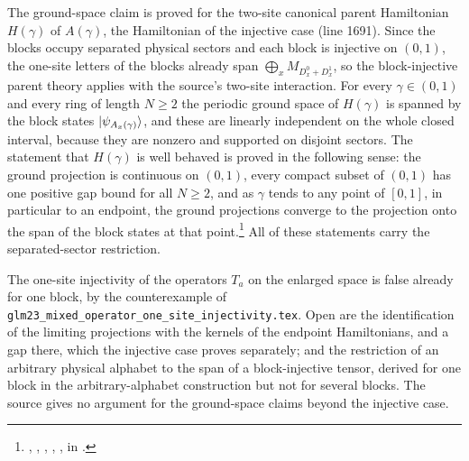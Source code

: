 \documentclass{article}
\begin{document}
The ground-space claim is proved for the two-site canonical parent
Hamiltonian $H(\gamma)$ of $A(\gamma)$, the Hamiltonian of the injective
case (line 1691). Since the blocks occupy separated physical sectors and
each block is injective on $(0,1)$, the one-site letters of the blocks
already span $\bigoplus_x M_{D^0_x+D^1_x}$, so the block-injective parent
theory applies with the source's two-site interaction. For every
$\gamma\in(0,1)$ and every ring of length $N\ge2$ the periodic ground space
of $H(\gamma)$ is spanned by the block states
$|\psi_{A_x(\gamma)}\rangle$, and these are linearly independent on the
whole closed interval, because they are nonzero and supported on disjoint
sectors. The statement that $H(\gamma)$ is well behaved is proved in the
following sense: the ground projection is continuous on $(0,1)$, every
compact subset of $(0,1)$ has one positive gap bound for all $N\ge2$, and
as $\gamma$ tends to any point of $[0,1]$, in particular to an endpoint,
the ground projections converge to the projection onto the span of the
block states at that point.\footnote{%
    ,
    ,
    ,
    ,
    ,
    in .}
All of these statements carry the separated-sector restriction.

The one-site injectivity of the operators $T_a$ on the enlarged space is
false already for one block, by the counterexample of
\texttt{glm23\_mixed\_operator\_one\_site\_injectivity.tex}. Open are the
identification of the limiting projections with the kernels of the
endpoint Hamiltonians, and a gap there, which the injective case proves
separately; and the restriction of
an arbitrary physical alphabet to the span of a block-injective tensor,
derived for one block in the arbitrary-alphabet construction but not for
several blocks. The source gives no argument for the ground-space claims
beyond the injective case.
\end{document}
